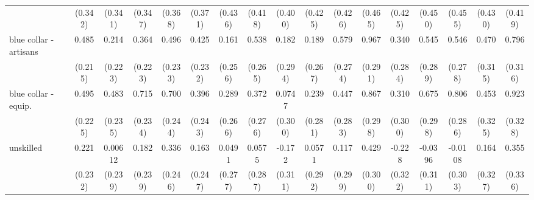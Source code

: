 {\begin{tabular}{l*{16}{c}}
                    &     (0.342)         &     (0.341)         &     (0.347)         &     (0.368)         &     (0.371)         &     (0.436)         &     (0.418)         &     (0.400)         &     (0.425)         &     (0.426)         &     (0.465)         &     (0.425)         &     (0.450)         &     (0.455)         &     (0.430)         &     (0.419)         \\
[1em]
blue collar - artisans&       0.485\sym{*}  &       0.214         &       0.364         &       0.496\sym{*}  &       0.425         &       0.161         &       0.538\sym{*}  &       0.182         &       0.189         &       0.579\sym{*}  &       0.967\sym{***}&       0.340         &       0.545         &       0.546\sym{*}  &       0.470         &       0.796\sym{*}  \\
                    &     (0.215)         &     (0.223)         &     (0.223)         &     (0.233)         &     (0.232)         &     (0.256)         &     (0.265)         &     (0.294)         &     (0.267)         &     (0.274)         &     (0.291)         &     (0.284)         &     (0.289)         &     (0.278)         &     (0.315)         &     (0.316)         \\
[1em]
blue collar - equip.&       0.495\sym{*}  &       0.483\sym{*}  &       0.715\sym{**} &       0.700\sym{**} &       0.396         &       0.289         &       0.372         &      0.0747         &       0.239         &       0.447         &       0.867\sym{**} &       0.310         &       0.675\sym{*}  &       0.806\sym{**} &       0.453         &       0.923\sym{**} \\
                    &     (0.225)         &     (0.235)         &     (0.234)         &     (0.244)         &     (0.243)         &     (0.266)         &     (0.276)         &     (0.300)         &     (0.281)         &     (0.283)         &     (0.298)         &     (0.300)         &     (0.298)         &     (0.286)         &     (0.325)         &     (0.328)         \\
[1em]
unskilled           &       0.221         &     0.00612         &       0.182         &       0.336         &       0.163         &      0.0491         &      0.0575         &      -0.172         &      0.0571         &       0.117         &       0.429         &      -0.228         &     -0.0396         &     -0.0108         &       0.164         &       0.355         \\
                    &     (0.232)         &     (0.239)         &     (0.239)         &     (0.246)         &     (0.247)         &     (0.277)         &     (0.287)         &     (0.311)         &     (0.292)         &     (0.299)         &     (0.300)         &     (0.322)         &     (0.311)         &     (0.303)         &     (0.327)         &     (0.336)         \\

\end{tabular}}
